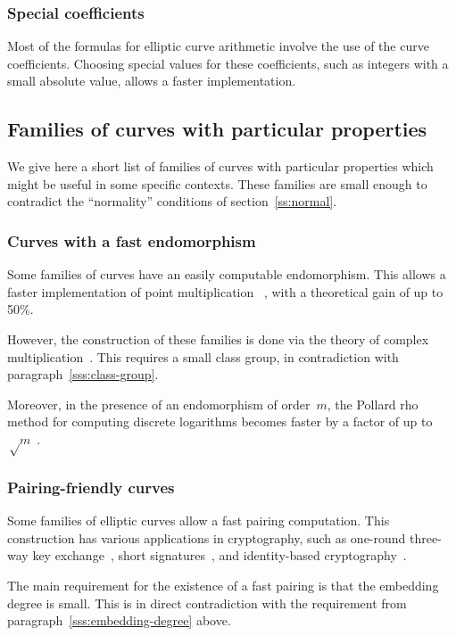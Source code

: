 \documentclass[twocolumn,letterpaper]{article}
\begin{document}
\subsubsection{Special coefficients}

Most of the formulas for elliptic curve arithmetic
involve the use of the curve coefficients.
Choosing special values for these coefficients,
such as integers with a small absolute value,
allows a faster implementation.

\subsection{Families of curves with particular properties}
\label{ss:particular}

We give here a short list of families of curves
with particular properties which might be useful in some specific contexts.
These families are small enough
to contradict the ``normality'' conditions of section~\ref{ss:normal}.

\subsubsection{Curves with a fast endomorphism}

Some families of curves have an easily computable endomorphism.
This allows a faster implementation of point multiplication%
~\cite{crypto2001glv}, with a theoretical gain of up to 50\%.

However, the construction of these families
is done via the theory of complex multiplication~\cite{asia2013smith}.
This requires a small class group,
in contradiction with paragraph~\ref{sss:class-group}.

Moreover, in the presence of an endomorphism of order~$m$,
the Pollard rho method for computing discrete logarithms
becomes faster by a factor of up to~$√m$~\cite{asia1999dgm,moc2000glv}.

\subsubsection{Pairing-friendly curves}
\label{sss:pairing}

Some families of elliptic curves allow a fast pairing computation.
This construction has various applications in cryptography,
such as one-round three-way key exchange~\cite{jc2004joux},
short signatures~\cite{jc2004bls},
and identity-based cryptography~\cite{crypto2001bf,el2002paterson}.

The main requirement for the existence of a fast pairing
is that the embedding degree is small.
This is in direct contradiction with
the requirement from paragraph~\ref{sss:embedding-degree} above.
\end{document}
